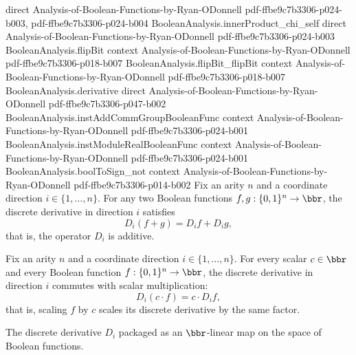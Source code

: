 \begin{lemma}
  {direct}
  {Analysis-of-Boolean-Functions-by-Ryan-ODonnell}
  {pdf-ffbe9c7b3306-p024-b003,
    pdf-ffbe9c7b3306-p024-b004}
\proofstep
  {BooleanAnalysis.innerProduct_chi_self}
  {direct}
  {Analysis-of-Boolean-Functions-by-Ryan-ODonnell}
  {pdf-ffbe9c7b3306-p024-b003}
\proofstep
  {BooleanAnalysis.flipBit}
  {context}
  {Analysis-of-Boolean-Functions-by-Ryan-ODonnell}
  {pdf-ffbe9c7b3306-p018-b007}
\proofstep
  {BooleanAnalysis.flipBit_flipBit}
  {context}
  {Analysis-of-Boolean-Functions-by-Ryan-ODonnell}
  {pdf-ffbe9c7b3306-p018-b007}
\proofstep
  {BooleanAnalysis.derivative}
  {direct}
  {Analysis-of-Boolean-Functions-by-Ryan-ODonnell}
  {pdf-ffbe9c7b3306-p047-b002}
\proofstep
  {BooleanAnalysis.instAddCommGroupBooleanFunc}
  {context}
  {Analysis-of-Boolean-Functions-by-Ryan-ODonnell}
  {pdf-ffbe9c7b3306-p024-b001}
\proofstep
  {BooleanAnalysis.instModuleRealBooleanFunc}
  {context}
  {Analysis-of-Boolean-Functions-by-Ryan-ODonnell}
  {pdf-ffbe9c7b3306-p024-b001}
\proofstep
  {BooleanAnalysis.boolToSign_not}
  {context}
  {Analysis-of-Boolean-Functions-by-Ryan-ODonnell}
  {pdf-ffbe9c7b3306-p014-b002}
Fix an arity $n$ and a coordinate direction $i \in \{1, \dots, n\}$. For any two Boolean
functions $f, g : \{0,1\}^n \to \bbr$, the discrete derivative in direction $i$
satisfies
\[
  D_i(f + g) = D_i f + D_i g,
\]
that is, the operator $D_i$ is additive.
\end{lemma}

\begin{lemma}
\label{BooleanAnalysis.derivative_smul}
\leanok
{}
Fix an arity $n$ and a coordinate direction $i \in \{1,\dots,n\}$. For every scalar $c
\in \bbr$ and every Boolean function $f : \{0,1\}^n \to \bbr$, the discrete derivative
in direction $i$ commutes with scalar multiplication:
\[
  D_i(c \cdot f) = c \cdot D_i f,
\]
that is, scaling $f$ by $c$ scales its discrete derivative by the same factor.
\end{lemma}

\begin{definition}
\label{BooleanAnalysis.derivativeLm}
\leanok
{}
The discrete derivative $D_i$ packaged as an $\bbr$-linear map on the space of
Boolean functions.
\end{definition}

